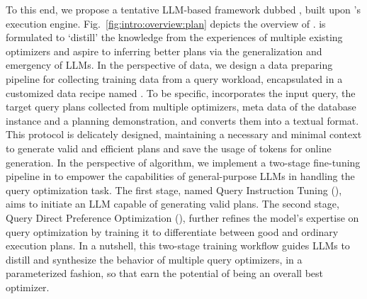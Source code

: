 To this end,  we propose a tentative LLM-based framework dubbed \LLMQO, built upon \Postgres's execution engine. Fig.~\ref{fig:intro:overview:plan} depicts the overview of \LLMQO.
\LLMQO is formulated to `distill' the knowledge from the experiences of multiple existing optimizers and aspire to inferring better plans via the generalization and emergency of LLMs. 
In the perspective of data, we design a data preparing pipeline for collecting training data from a query workload, encapsulated in a customized data recipe named \QueryInstruct. 
To be specific, 
\QueryInstruct incorporates the input query, the target query plans collected from multiple optimizers, meta data of the database instance and a planning demonstration, and converts them into a textual format. 
This protocol is delicately designed, maintaining a necessary and minimal context to generate valid and efficient plans and save the usage of tokens for online generation. 
In the perspective of algorithm, we implement a two-stage fine-tuning pipeline in \LLMQO to empower the capabilities of general-purpose LLMs in handling the query optimization task. The first stage, named Query Instruction Tuning (\QIT), aims to initiate an LLM capable of generating valid plans.
The second stage, Query Direct Preference Optimization (\QDPO), further refines the model's expertise on query optimization by training it to differentiate between good and ordinary execution plans. 
In a nutshell, this two-stage training workflow guides LLMs to distill and synthesize the behavior of multiple query
optimizers, in a parameterized fashion, so that earn the potential
of being an overall best optimizer. 

